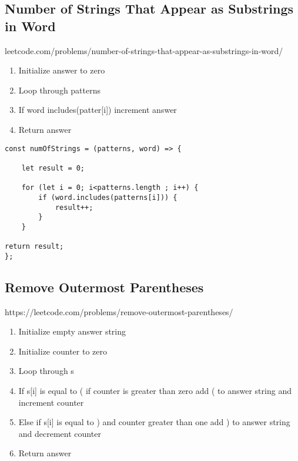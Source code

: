 \documentclass[10pt]{article}
\begin{document}
\medskip %





\pagebreak %
\medskip 
\subsection{Number of Strings That Appear as Substrings in Word}
leetcode.com/problems/number-of-strings-that-appear-as-substrings-in-word/

\begin{enumerate}
	\item Initialize answer to zero 
	\item Loop through patterns
	\item If word includes(patter[i]) increment answer
	\item Return answer
\end{enumerate}



\begin{lstlisting}[title=Solution numOfStrings, captionpos=t]
const numOfStrings = (patterns, word) => {

    let result = 0;
    
    for (let i = 0; i<patterns.length ; i++) {
        if (word.includes(patterns[i])) {
            result++;
        }
    }
    
return result;
};
\end{lstlisting}
\medskip %




\pagebreak %
\medskip 
\subsection{Remove Outermost Parentheses}
https://leetcode.com/problems/remove-outermost-parentheses/

\begin{enumerate}
	\item Initialize empty answer string
	\item Initialize counter to zero 
	\item Loop through s 
	\item If s[i] is equal to ( if counter is greater than zero add ( to answer string and increment counter
	\item Else if s[i] is equal to ) and counter greater than one add ) to answer string and decrement counter
	\item Return answer 
\end{enumerate}
\end{document}
